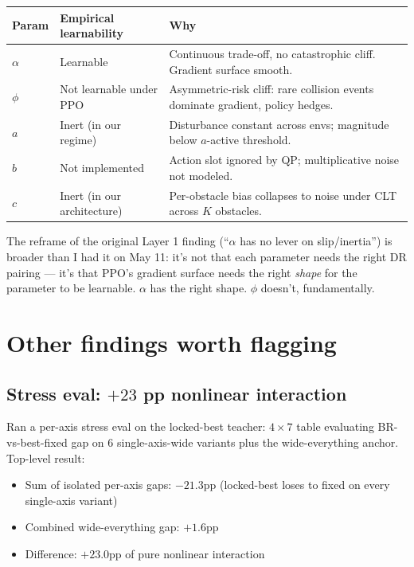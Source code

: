 \documentclass[11pt]{article}
\begin{document}
\begin{center}
\begin{tabular}{@{}l p{2.0in} p{2.3in}@{}}
\toprule
Param & Empirical learnability & Why \\
\midrule
$\alpha$ & Learnable & Continuous trade-off, no catastrophic cliff. Gradient surface smooth. \\
$\phi$ & Not learnable under PPO & Asymmetric-risk cliff: rare collision events dominate gradient, policy hedges. \\
$a$ & Inert (in our regime) & Disturbance constant across envs; magnitude below $a$-active threshold. \\
$b$ & Not implemented & Action slot ignored by QP; multiplicative noise not modeled. \\
$c$ & Inert (in our architecture) & Per-obstacle bias collapses to noise under CLT across $K$ obstacles. \\
\bottomrule
\end{tabular}
\end{center}

The reframe of the original Layer 1 finding (``$\alpha$ has no lever on slip/inertia'') is broader than I had it on May 11: it's not that each parameter needs the right DR pairing --- it's that PPO's gradient surface needs the right \emph{shape} for the parameter to be learnable. $\alpha$ has the right shape. $\phi$ doesn't, fundamentally.

\section*{Other findings worth flagging}

\subsection*{Stress eval: $+23$ pp nonlinear interaction}

Ran a per-axis stress eval on the locked-best teacher: $4 \times 7$ table evaluating BR-vs-best-fixed gap on 6 single-axis-wide variants plus the wide-everything anchor. Top-level result:

\begin{itemize}
\item Sum of isolated per-axis gaps: $-21.3$pp (locked-best loses to fixed on every single-axis variant)
\item Combined wide-everything gap: $+1.6$pp
\item Difference: $+23.0$pp of pure nonlinear interaction
\end{itemize}
\end{document}
